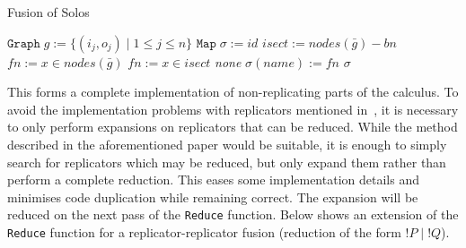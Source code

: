         \begin{breakablealgorithm}
            \caption{Fusion of Solos}
            \begin{algorithmic}[1]
                    \State$\texttt{Graph} \; g := \{(i_j, o_j) \; | \; 1 \leq j \leq n\}$
                    \State$\texttt{Map} \; \sigma := id$
                        \State$isect := nodes(\bar{g}) - bn$
                            \State$fn := x \in nodes(\bar{g})$
                            \State$fn := x \in isect$
                        \Else
                            \State\Return\textit{none}
                        \EndIf
                            \State$\sigma(name) := fn$
                        \EndFor
                    \EndFor
                    \State\Return$\sigma$
                \EndFunction
            \end{algorithmic}
        \end{breakablealgorithm}

        This forms a complete implementation of non-replicating parts of the calculus.
        To avoid the implementation problems with replicators mentioned in~\cite{solo-diagrams}, it is necessary to only perform expansions on replicators that can be reduced.
        While the method described in the aforementioned paper would be suitable, it is enough to simply search for replicators which may be reduced, but only expand them rather than perform a complete reduction.
        This eases some implementation details and minimises code duplication while remaining correct.
        The expansion will be reduced on the next pass of the \texttt{Reduce} function.
        Below shows an extension of the \texttt{Reduce} function for a replicator-replicator fusion (reduction of the form $!P \;|\; !Q$).

